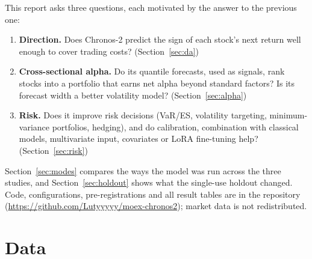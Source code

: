 \documentclass[11pt]{article}
\newcommand{\repo}{\url{https://github.com/Lutyyyyy/moex-chronos2}}
\begin{document}
This report asks three questions, each motivated by the answer to the previous one:
\begin{enumerate}
  \item \textbf{Direction.} Does Chronos-2 predict the sign of each stock's next return well enough to cover
    trading costs? (Section~\ref{sec:da})
  \item \textbf{Cross-sectional alpha.} Do its quantile forecasts, used as signals, rank stocks into a portfolio
    that earns net alpha beyond standard factors? Is its forecast width a better volatility model?
    (Section~\ref{sec:alpha})
  \item \textbf{Risk.} Does it improve risk decisions (VaR/ES, volatility targeting, minimum-variance portfolios,
    hedging), and do calibration, combination with classical models, multivariate input, covariates or LoRA
    fine-tuning help? (Section~\ref{sec:risk})
\end{enumerate}
Section~\ref{sec:modes} compares the ways the model was run across the three studies, and
Section~\ref{sec:holdout} shows what the single-use holdout changed. Code, configurations, pre-registrations
and all result tables are in the repository (\repo); market data is not redistributed.

\section{Data}\label{sec:data}
\end{document}
